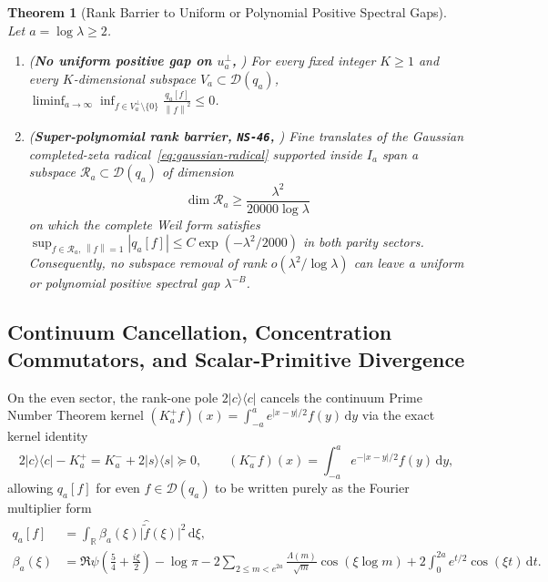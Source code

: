 \documentclass[11pt]{article}
\newtheorem{theorem}{Theorem}[section]
\theoremstyle{remark}
\newcommand{\norm}[1]{\left\lVert #1\right\rVert}
\newcommand{\dd}{\mathrm d}
\begin{document}
\begin{theorem}[Rank Barrier to Uniform or Polynomial Positive Spectral Gaps]
\label{thm:rank-barrier}
Let $a = \log\lambda \ge 2$.
\begin{enumerate}[label=(\alph*)]
  \item (\textbf{No uniform positive gap on $u_a^\perp$, }) For every fixed integer $K \ge 1$ and every $K$-dimensional subspace $V_a \subset \mathcal{D}(q_a)$, $\liminf_{a\to\infty} \inf_{f \in V_a^\perp \setminus \{0\}} \frac{q_a[f]}{\norm{f}^2} \le 0$.
  \item (\textbf{Super-polynomial rank barrier, \texttt{NS-46}, }) Fine translates of the Gaussian completed-zeta radical~\eqref{eq:gaussian-radical} supported inside $I_a$ span a subspace $\mathcal{R}_a \subset \mathcal{D}(q_a)$ of dimension
  \begin{equation}
    \dim \mathcal{R}_a \ge \frac{\lambda^2}{20000\log\lambda}
  \end{equation}
  on which the complete Weil form satisfies $\sup_{f \in \mathcal{R}_a, \, \norm{f}=1} |q_a[f]| \le C \exp(-\lambda^2/2000)$ in both parity sectors. Consequently, no subspace removal of rank $o(\lambda^2/\log\lambda)$ can leave a uniform or polynomial positive spectral gap $\lambda^{-B}$.
\end{enumerate}
\end{theorem}

\subsection{Continuum Cancellation, Concentration Commutators, and Scalar-Primitive Divergence}

On the even sector, the rank-one pole $2|c\rangle\langle c|$ cancels the continuum Prime Number Theorem kernel $(K_a^+ f)(x) = \int_{-a}^a e^{|x-y|/2}f(y)\,\dd y$ via the exact kernel identity
\begin{equation}\label{eq:continuum-cancel}
  2|c\rangle\langle c| - K_a^+ = K_a^- + 2|s\rangle\langle s| \succeq 0, \qquad (K_a^- f)(x) = \int_{-a}^a e^{-|x-y|/2}f(y)\,\dd y,
\end{equation}
allowing $q_a[f]$ for even $f \in \mathcal{D}(q_a)$ to be written purely as the Fourier multiplier form
\begin{align}\label{eq:beta-symbol}
  q_a[f] &= \int_{\mathbb{R}} \beta_a(\xi)\bigl|\widehat{\widetilde{f}}(\xi)\bigr|^2\,\dd\xi, \\
  \beta_a(\xi) &= \Re\psi\!\left(\frac{5}{4} + \frac{i\xi}{2}\right) - \log\pi - 2\sum_{2 \le m < e^{2a}} \frac{\Lambda(m)}{\sqrt{m}}\cos(\xi\log m) + 2\int_0^{2a} e^{t/2}\cos(\xi t)\,\dd t.\nonumber
\end{align}
\end{document}
